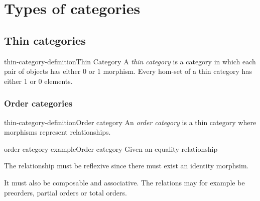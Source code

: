 \documentclass[preview]{standalone}
\begin{document}
\section{Types of categories}

\subsection{Thin categories}

\begin{snippetdefinition}{thin-category-definition}{Thin Category}
    A \textit{thin category} is a category in which each pair of objects
    has either \(0\) or \(1\) morphism.
    Every hom-set of a thin category has either \(1\) or \(0\) elements.
\end{snippetdefinition}

\subsubsection{Order categories}

\begin{snippetdefinition}{thin-category-definition}{Order category}
    An \textit{order category} is a thin category where morphisms represent relationships.
\end{snippetdefinition}

\begin{snippetexample}{order-category-example}{Order category}
    Given an equality relationship

    \begin{center}
    \end{center}

    The relationship must be reflexive since there must exist an identity morphsim.

    \begin{center}
    \end{center}

    It must also be composable and associative.
    The relations may for example be preorders, partial orders
    or total orders.
\end{snippetexample}
\end{document}
